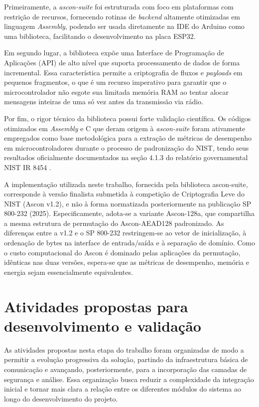 Primeiramente, a \textit{ascon-suite} foi estruturada com foco em plataformas com restrição de recursos, fornecendo rotinas de \textit{backend} altamente otimizadas em linguagem \textit{Assembly}, podendo ser usada diretamente na IDE do Arduino como uma biblioteca, facilitando o desenvolvimento na placa ESP32.

Em segundo lugar, a biblioteca expõe uma Interface de Programação de Aplicações (API) de alto nível que suporta processamento de dados de forma incremental. Essa característica permite a criptografia de fluxos e \textit{payloads} em pequenos fragmentos, o que é um recurso imperativo para garantir que o microcontrolador não esgote sua limitada memória RAM ao tentar alocar mensagens inteiras de uma só vez antes da transmissão via rádio.

Por fim, o rigor técnico da biblioteca possui forte validação científica. Os códigos otimizados em \textit{Assembly} e C que deram origem à \textit{ascon-suite} foram ativamente empregados como base metodológica para a extração de métricas de desempenho em microcontroladores durante o processo de padronização do NIST, tendo seus resultados oficialmente documentados na seção 4.1.3 do relatório governamental NIST IR 8454 \cite{nistir8454}.

A implementação utilizada neste trabalho, fornecida pela biblioteca ascon-suite, corresponde à versão finalista submetida à competição de Criptografia Leve do NIST (Ascon v1.2), e não à forma normatizada posteriormente na publicação SP 800-232 (2025). Especificamente, adota-se a variante Ascon-128a, que compartilha a mesma estrutura de permutação do Ascon-AEAD128 padronizado. As diferenças entre a v1.2 e o SP 800-232 restringem-se ao vetor de inicialização, à ordenação de bytes na interface de entrada/saída e à separação de domínio. Como o custo computacional do Ascon é dominado pelas aplicações da permutação, idênticas nas duas versões, espera-se que as métricas de desempenho, memória e energia sejam essencialmente equivalentes.


\section{Atividades propostas para desenvolvimento e validação}

As atividades propostas nesta etapa do trabalho foram organizadas de modo a permitir a evolução progressiva da solução, partindo da infraestrutura básica de comunicação e avançando, posteriormente, para a incorporação das camadas de segurança e análise. Essa organização busca reduzir a complexidade da integração inicial e tornar mais clara a relação entre os diferentes módulos do sistema ao longo do desenvolvimento do projeto.

